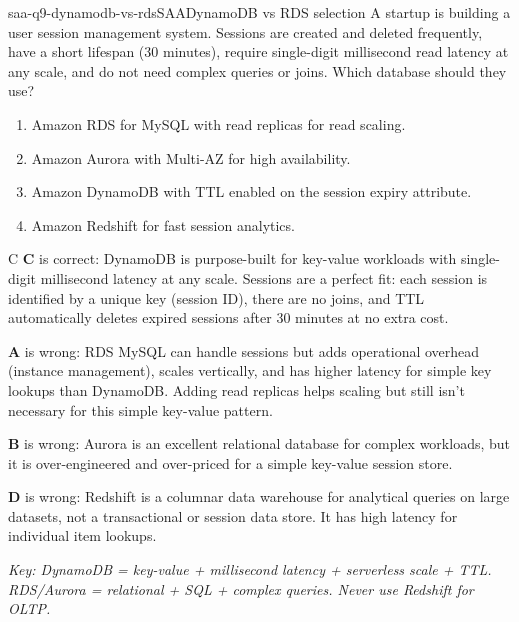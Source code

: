 
\begin{question}{saa-q9-dynamodb-vs-rds}{SAA}{DynamoDB vs RDS selection}
A startup is building a user session management system. Sessions are created and deleted frequently, have a short lifespan (30 minutes), require single-digit millisecond read latency at any scale, and do not need complex queries or joins. Which database should they use?

\begin{enumerate}[label=\Alph*.]
  \item Amazon RDS for MySQL with read replicas for read scaling.
  \item Amazon Aurora with Multi-AZ for high availability.
  \item Amazon DynamoDB with TTL enabled on the session expiry attribute.
  \item Amazon Redshift for fast session analytics.
\end{enumerate}
\end{question}

\begin{answer}{C}
\textbf{C} is correct: DynamoDB is purpose-built for key-value workloads with single-digit millisecond latency at any scale. Sessions are a perfect fit: each session is identified by a unique key (session ID), there are no joins, and TTL automatically deletes expired sessions after 30 minutes at no extra cost.

\textbf{A} is wrong: RDS MySQL can handle sessions but adds operational overhead (instance management), scales vertically, and has higher latency for simple key lookups than DynamoDB. Adding read replicas helps scaling but still isn't necessary for this simple key-value pattern.

\textbf{B} is wrong: Aurora is an excellent relational database for complex workloads, but it is over-engineered and over-priced for a simple key-value session store.

\textbf{D} is wrong: Redshift is a columnar data warehouse for analytical queries on large datasets, not a transactional or session data store. It has high latency for individual item lookups.

\textit{Key: DynamoDB = key-value + millisecond latency + serverless scale + TTL. RDS/Aurora = relational + SQL + complex queries. Never use Redshift for OLTP.}
\end{answer}


